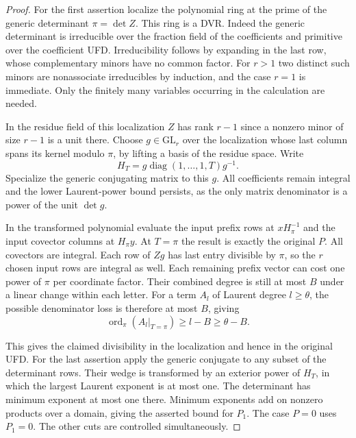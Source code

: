 \begin{proof}
For the first assertion localize the polynomial ring at the
prime of the generic determinant \(\pi=\det Z\). This ring
is a DVR. Indeed the generic determinant is irreducible over
the fraction field of the coefficients and primitive over the
coefficient UFD. Irreducibility follows by expanding in the
last row, whose complementary minors have no common factor.
For \(r>1\) two distinct such minors are nonassociate irreducibles
by induction, and the case \(r=1\) is immediate. Only the finitely
many variables occurring in the calculation are needed.

In the
residue field of this localization \(Z\) has rank \(r-1\)
since a nonzero minor of size \(r-1\) is a unit there.
Choose \(g\in\mathrm{GL}_r\) over the localization whose last
column spans its kernel modulo \(\pi\), by lifting a basis of
the residue space. Write
\[
 H_T=g\operatorname{diag} (1,\ldots,1,T)g^{-1}.
\]
Specialize the generic conjugating
matrix to this \(g\). All coefficients remain integral and the
lower Laurent-power bound persists, as the only matrix denominator
is a power of the unit \(\det g\).

In the transformed polynomial evaluate the input prefix rows at
\(xH_\pi^{-1}\) and the input covector columns at \(H_\pi y\).
At \(T=\pi\) the result is exactly the original \(P\).
All covectors are integral. Each row of \(Zg\) has last entry
divisible by \(\pi\), so the \(r\) chosen input rows are
integral as well. Each remaining prefix vector can cost one
power of \(\pi\) per coordinate factor. Their combined
degree is still at most \(B\) under a linear change within
each letter. For a term \(A_l\) of Laurent degree \(l\ge\theta\), the possible denominator loss is therefore at most \(B\), giving
\[
 \operatorname{ord}_\pi(A_l|_{T=\pi})\ge l-B\ge\theta-B.
\]

This gives the claimed divisibility in the localization and
hence in the original UFD. For the last assertion apply the
generic conjugate to any subset of the determinant rows. Their
wedge is transformed by an exterior power of \(H_T\), in which
the largest Laurent exponent is at most one. The determinant
has minimum exponent at most one there. Minimum exponents
add on nonzero products over a domain, giving the asserted
bound for \(P_1\). The case \(P=0\) uses \(P_1=0\).
The other cuts are controlled simultaneously.

\end{proof}

